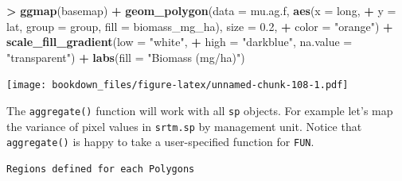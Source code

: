 \documentclass[]{krantz}
\makeatletter
\newenvironment{Shaded}{\begin{snugshade}}{\end{snugshade}}
\newcommand{\KeywordTok}[1]{\textcolor[rgb]{0.27,0.27,0.27}{\textbf{#1}}}
\newcommand{\DataTypeTok}[1]{\textcolor[rgb]{0.27,0.27,0.27}{#1}}
\newcommand{\FloatTok}[1]{\textcolor[rgb]{0.06,0.06,0.06}{#1}}
\newcommand{\StringTok}[1]{\textcolor[rgb]{0.5,0.5,0.5}{#1}}
\newcommand{\ControlFlowTok}[1]{\textcolor[rgb]{0.27,0.27,0.27}{\textbf{#1}}}
\newcommand{\OperatorTok}[1]{\textcolor[rgb]{0.43,0.43,0.43}{\textbf{#1}}}
\newcommand{\ErrorTok}[1]{\textcolor[rgb]{0.14,0.14,0.14}{\textbf{#1}}}
\newcommand{\NormalTok}[1]{#1}
\newenvironment{kframe}{%
\medskip{}
\setlength{\fboxsep}{.8em}
 \def\at@end@of@kframe{}%
 \ifinner\ifhmode%
  \def\at@end@of@kframe{\end{minipage}}%
  \begin{minipage}{\columnwidth}%
 \fi\fi%
 \def\FrameCommand##1{\hskip\@totalleftmargin \hskip-\fboxsep
 \colorbox{shadecolor}{##1}\hskip-\fboxsep
     \hskip-\linewidth \hskip-\@totalleftmargin \hskip\columnwidth}%
 \MakeFramed {\advance\hsize-\width
   \@totalleftmargin\z@ \linewidth\hsize
   \@setminipage}}%
 {\par\unskip\endMakeFramed%
 \at@end@of@kframe}
\renewenvironment{Shaded}{\begin{kframe}}{\end{kframe}}
\theoremstyle{definition}
\theoremstyle{definition}
\theoremstyle{definition}
\theoremstyle{remark}
\makeatother
\begin{document}
\begin{Shaded}
\begin{Highlighting}[]
\OperatorTok{>}\StringTok{ }\KeywordTok{ggmap}\NormalTok{(basemap) }\OperatorTok{+}\StringTok{ }\KeywordTok{geom_polygon}\NormalTok{(}\DataTypeTok{data =}\NormalTok{ mu.ag.f, }\KeywordTok{aes}\NormalTok{(}\DataTypeTok{x =}\NormalTok{ long, }
\OperatorTok{+}\StringTok{   }\DataTypeTok{y =}\NormalTok{ lat, }\DataTypeTok{group =}\NormalTok{ group, }\DataTypeTok{fill =}\NormalTok{ biomass_mg_ha), }\DataTypeTok{size =} \FloatTok{0.2}\NormalTok{, }
\OperatorTok{+}\StringTok{   }\DataTypeTok{color =} \StringTok{"orange"}\NormalTok{) }\OperatorTok{+}\StringTok{ }\KeywordTok{scale_fill_gradient}\NormalTok{(}\DataTypeTok{low =} \StringTok{"white"}\NormalTok{, }
\OperatorTok{+}\StringTok{   }\DataTypeTok{high =} \StringTok{"darkblue"}\NormalTok{, }\DataTypeTok{na.value =} \StringTok{"transparent"}\NormalTok{) }\OperatorTok{+}\StringTok{ }\KeywordTok{labs}\NormalTok{(}\DataTypeTok{fill =} \StringTok{"Biomass (mg/ha)"}\NormalTok{)}
\end{Highlighting}
\end{Shaded}

\texttt{[image: bookdown\_files/figure-latex/unnamed-chunk-108-1.pdf]}

The \texttt{aggregate()} function will work with all \texttt{sp}
objects. For example let's map the variance of pixel values in
\texttt{srtm.sp} by management unit. Notice that \texttt{aggregate()} is
happy to take a user-specified function for \texttt{FUN}.

\begin{Shaded}
\end{Shaded}

\begin{verbatim}
Regions defined for each Polygons
\end{verbatim}
\end{document}
